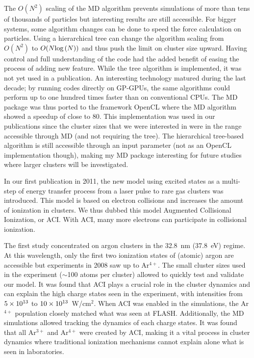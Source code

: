 The $O(N^2)$ scaling of the MD algorithm prevents simulations of more than tens
of thousands of particles but interesting results are still accessible.
For bigger systems, some algorithm changes can be done to speed the force
calculation on particles. Using a hierarchical tree can change the algorithm
scaling from $O(N^2)$ to $O(N \textrm{log}\left( N \right))$ and thus push the limit on
cluster size upward. Having control and full understanding of the code had
the added benefit of easing the process of adding new feature. While the tree
algorithm is implemented, it was not yet used in a publication. An interesting
technology matured during the last decade; by running codes directly on GP-GPUs,
the same algorithms could perform up to one hundred times faster than on
conventional CPUs. The MD package was thus ported to the framework OpenCL where
the MD algorithm showed a speedup of close to 80. This implementation was used
in our publications since the cluster sizes that we were interested in were
in the range accessible through MD (and not requiring the tree). The
hierarchical tree-based algorithm is still accessible through an input parameter
(not as an OpenCL implementation though), making my MD package interesting for
future studies where larger clusters will be investigated.

In our first publication in 2011, the new model using excited states as a
multi-step of energy transfer process from a laser pulse to rare gas clusters
was introduced. This model is based on electron collisions and increases the
amount of ionization in clusters. We thus dubbed this model Augmented
Collisional Ionization, or ACI. With ACI, many more electrons can participate in
collisional ionization.

The first study concentrated on argon clusters in the 32.8~nm (37.8~eV) regime.
At this wavelength, only the first two ionization states of (atomic) argon are
accessible but experiments in 2008 saw up to Ar$^{4+}$. The small cluster sizes
used in the experiment ($\sim$100 atoms per cluster) allowed to quickly test and
validate our model. It was found that ACI plays a crucial role in the cluster
dynamics and can explain the high charge states seen in the experiment, with
intensities from $\ten{5}{13}$ to $\ten{10}{13}$~W/cm$^{2}$. When ACI was
enabled in the simulations, the Ar$^{4+}$ population closely matched what was
seen at FLASH. Additionally, the MD simulations allowed tracking the dynamics
of each charge states. It was found that all Ar$^{3+}$ and Ar$^{4+}$ were
created by ACI, making it a vital process in cluster dynamics where traditional
ionization mechanisms cannot explain alone what is seen in laboratories.

